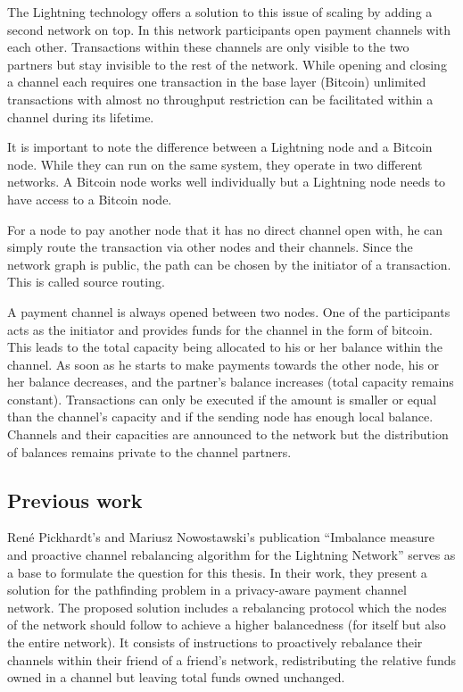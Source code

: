 \documentclass[final]{fhnwreport}       %
\begin{document}
The Lightning technology offers a solution to this issue of scaling by adding a second network on top. In this network participants open payment channels with each other. Transactions within these channels are only visible to the two partners but stay invisible to the rest of the network. While opening and closing a channel each requires one transaction in the base layer (Bitcoin) unlimited transactions with almost no throughput restriction can be facilitated within a channel during its lifetime. 

It is important to note the difference between a Lightning node and a Bitcoin node. While they can run on the same system, they operate in two different networks. A Bitcoin node works well individually but a Lightning node needs to have access to a Bitcoin node.

For a node to pay another node that it has no direct channel open with, he can simply route the transaction via other nodes and their channels. Since the network graph is public, the path can be chosen by the initiator of a transaction. This is called source routing. 

A payment channel is always opened between two nodes. One of the participants acts as the initiator and provides funds for the channel in the form of bitcoin. This leads to the total capacity being allocated to his or her balance within the channel. As soon as he starts to make payments towards the other node, his or her balance decreases, and the partner's balance increases (total capacity remains constant). Transactions can only be executed if the amount is smaller or equal than the channel's capacity and if the sending node has enough local balance. Channels and their capacities are announced to the network but the distribution of balances remains private to the channel partners.

\subsection{Previous work}
René Pickhardt's and Mariusz Nowostawski's publication ``Imbalance measure and proactive channel rebalancing algorithm for the Lightning Network'' \cite{pickhardt_imbalance_2019} serves as a base to formulate the question for this thesis. In their work, they present a solution for the pathfinding problem in a privacy-aware payment channel network. The proposed solution includes a rebalancing protocol which the nodes of the network should follow to achieve a higher balancedness (for itself but also the entire network). It consists of instructions to proactively rebalance their channels within their friend of a friend's network, redistributing the relative funds owned in a channel but leaving total funds owned unchanged.
\end{document}
